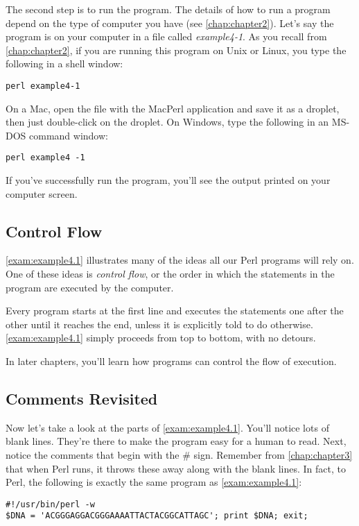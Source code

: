 The second step is to run the program. The details of how to run a program depend on the type of computer you have (see \autoref{chap:chapter2}). Let's say the program is on your computer in a file called \textit{example4-1}. As you recall from \autoref{chap:chapter2}, if you are running this program on Unix or Linux, you type the following in a shell window:

\verb|perl example4-1 |

On a Mac, open the file with the MacPerl application and save it as a droplet, then just double-click on the droplet. On Windows, type the following in an MS-DOS command window: 

\verb|perl example4 -1|

If you've successfully run the program, you'll see the output printed on your computer screen. 

\subsection{Control Flow}
\autoref{exam:example4.1} illustrates many of the ideas all our Perl programs will rely on. One of these ideas is \textit{control flow}, or the order in which the statements in the program are executed by the computer.

Every program starts at the first line and executes the statements one after the other until it reaches the end, unless it is explicitly told to do otherwise. \autoref{exam:example4.1} simply proceeds from top to bottom, with no detours.

In later chapters, you'll learn how programs can control the flow of execution. 

\subsection{Comments Revisited}
Now let's take a look at the parts of \autoref{exam:example4.1}. You'll notice lots of blank lines. They're there to make the program easy for a human to read.  Next, notice the comments that begin with the \# sign. Remember from \autoref{chap:chapter3} that when Perl runs, it throws these away along with the blank lines. In fact, to Perl, the following is exactly the same program as \autoref{exam:example4.1}: 

\begin{lstlisting}
#!/usr/bin/perl -w
$DNA = 'ACGGGAGGACGGGAAAATTACTACGGCATTAGC'; print $DNA; exit;
\end{lstlisting}

